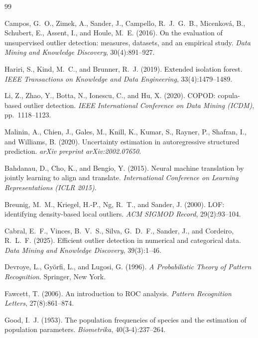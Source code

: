 \documentclass[11pt]{article}
\theoremstyle{plain}
\theoremstyle{definition}
\begin{document}

\begin{thebibliography}{99}

Campos, G.~O., Zimek, A., Sander, J., Campello,
R.~J.~G.~B., Micenkov\'{a}, B., Schubert, E.,
Assent, I., and Houle, M.~E. (2016).
On the evaluation of unsupervised outlier detection:
measures, datasets, and an empirical study.
\textit{Data Mining and Knowledge Discovery},
30(4):891--927.

Hariri, S., Kind, M.~C., and Brunner, R.~J. (2019).
Extended isolation forest.
\textit{IEEE Transactions on Knowledge and Data
Engineering}, 33(4):1479--1489.

Li, Z., Zhao, Y., Botta, N., Ionescu, C., and
Hu, X. (2020). COPOD: copula-based outlier detection.
\textit{IEEE International Conference on Data Mining
(ICDM)}, pp.~1118--1123.

Malinin, A., Chien, J., Gales, M., Knill, K.,
Kumar, S., Rayner, P., Shafran, I., and Williams, B.
(2020). Uncertainty estimation in autoregressive
structured prediction.
\textit{arXiv preprint arXiv:2002.07650}.

Bahdanau, D., Cho, K., and Bengio, Y. (2015).
Neural machine translation by jointly learning to align
and translate.
\textit{International Conference on Learning
Representations (ICLR 2015)}.

Breunig, M.~M., Kriegel, H.-P., Ng, R.~T., and
Sander, J. (2000). LOF: identifying density-based
local outliers. \textit{ACM SIGMOD Record},
29(2):93--104.

Cabral, E.~F., Vinces, B.~V.~S., Silva, G.~D.~F.,
Sander, J., and Cordeiro, R.~L.~F. (2025).
Efficient outlier detection in numerical and categorical
data. \textit{Data Mining and Knowledge Discovery},
39(3):1--46.

Devroye, L., Gy\"{o}rfi, L., and Lugosi, G. (1996).
\textit{A Probabilistic Theory of Pattern Recognition}.
Springer, New York.

Fawcett, T. (2006). An introduction to ROC analysis.
\textit{Pattern Recognition Letters}, 27(8):861--874.

Good, I.~J. (1953). The population frequencies of
species and the estimation of population parameters.
\textit{Biometrika}, 40(3-4):237--264.


\end{thebibliography}
\end{document}
